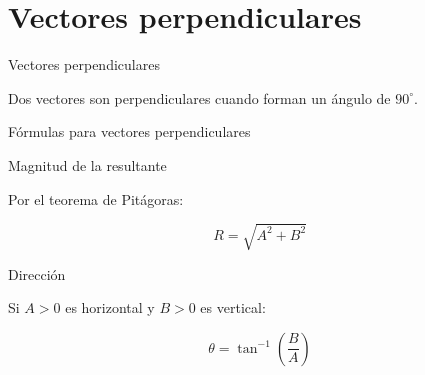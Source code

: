 \documentclass[aspectratio=169,11pt]{beamer}
\begin{document}
\section{Vectores perpendiculares}

\begin{frame}{Vectores perpendiculares}

Dos vectores son perpendiculares
cuando forman un ángulo de
\(90^\circ\).

\begin{center}
\end{center}

\end{frame}

\begin{frame}{Fórmulas para vectores perpendiculares}

\begin{block}{Magnitud de la resultante}

Por el teorema de Pitágoras:

\[
\boxed{R=\sqrt{A^2+B^2}}
\]

\end{block}

\begin{block}{Dirección}

Si \(A>0\) es horizontal
y \(B>0\) es vertical:

\[
\boxed{
\theta=\tan^{-1}\left(\frac{B}{A}\right)
}
\]

\end{block}

\end{frame}
\end{document}

